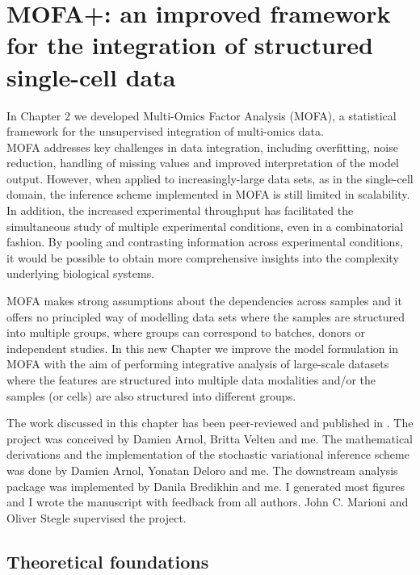 \graphicspath{{Chapter4/Figs/simulations/}{Chapter4/Figs/scrna/}{Chapter4/Figs/scmet/}{Chapter4/Figs/scnmt/}}

\chapter{MOFA+: an improved framework for the integration of structured single-cell data}

In Chapter 2 we developed Multi-Omics Factor Analysis (MOFA), a statistical framework for the unsupervised integration of multi-omics data. \\
MOFA addresses key challenges in data integration, including overfitting, noise reduction, handling of missing values and improved interpretation of the model output. However, when applied to increasingly-large data sets, as in the single-cell domain, the inference scheme implemented in MOFA is still limited in scalability. In addition, the increased experimental throughput has facilitated the simultaneous study of multiple experimental conditions, even in a combinatorial fashion\cite{Replogle2020}. By pooling and contrasting information across experimental conditions, it would be possible to obtain more comprehensive insights into the complexity underlying biological systems.

MOFA makes strong assumptions about the dependencies across samples and it offers no principled way of modelling data sets where the samples are structured into multiple groups, where groups can correspond to batches, donors or independent studies. In this new Chapter we improve the model formulation in MOFA with the aim of performing integrative analysis of large-scale datasets where the features are structured into multiple data modalities and/or the samples (or cells) are also structured into different groups.

The work discussed in this chapter has been peer-reviewed and published in \cite{Argelaguet2020}. The project was conceived by Damien Arnol, Britta Velten and me. The mathematical derivations and the implementation of the stochastic variational inference scheme was done by Damien Arnol, Yonatan Deloro and me. The downstream analysis package was implemented by Danila Bredikhin and me. I generated most figures and I wrote the manuscript with feedback from all authors. John C. Marioni and Oliver Stegle supervised the project. 

\section{Theoretical foundations}

